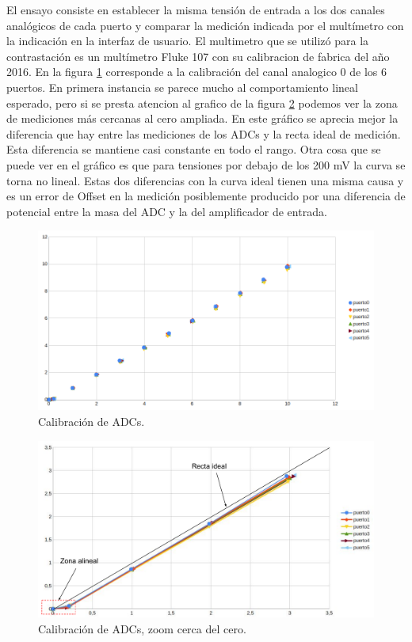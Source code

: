El ensayo consiste en establecer la misma tensión de entrada a los dos canales analógicos de cada puerto y comparar la medición indicada por el multímetro con la indicación en la interfaz de usuario. El multimetro que se utilizó para la contrastación es un multímetro Fluke 107 con su calibracion de fabrica del año 2016.
En la figura \ref{fig:CalADCs} corresponde a la calibración del canal analogico 0 de los 6 puertos. En primera instancia se parece mucho al comportamiento lineal esperado, pero si se presta atencion al grafico de la figura \ref{fig:CalADCzoom} podemos ver la zona de mediciones más cercanas al cero ampliada. En este gráfico se aprecia mejor la diferencia que hay entre las mediciones de los ADCs y la recta ideal de medición. Esta diferencia se mantiene casi constante en todo el rango. Otra cosa que se puede ver en el gráfico es que para tensiones por debajo de los 200 mV  la curva se torna no lineal.
Estas dos diferencias con la curva ideal tienen una misma causa y es un error de Offset en la medición posiblemente producido por una diferencia de potencial entre la masa del ADC y la del amplificador de entrada. 

\begin{figure}[H]
	\centering
	\includegraphics[width=1\textwidth]{./Figures/CalADCs.png}
	\caption{Calibración de ADCs.}
	\label{fig:CalADCs}
\end{figure}

\begin{figure}[H]
	\centering
	\includegraphics[width=1\textwidth]{./Figures/CalADCzoom.pdf}
	\caption{Calibración de ADCs, zoom cerca del cero.}
	\label{fig:CalADCzoom}
\end{figure}

